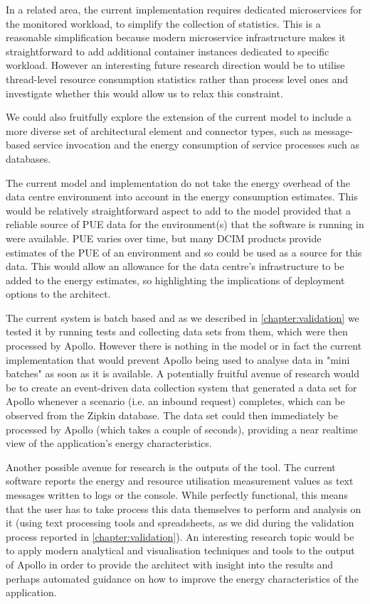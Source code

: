 In a related area, the current implementation requires dedicated microservices for the monitored workload, to simplify the collection of statistics.  This is a reasonable simplification because modern microservice infrastructure makes it straightforward to add additional container instances dedicated to specific workload.  However an interesting future research direction would be to utilise thread-level resource consumption statistics rather than process level ones and investigate whether this would allow us to relax this constraint.

We could also fruitfully explore the extension of the current model to include a more diverse set of architectural element and connector types, such as message-based service invocation and the energy consumption of service processes such as databases.

The current model and implementation do not take the energy overhead of the data centre environment into account in the energy consumption estimates.  This would be relatively straightforward aspect to add to the model provided that a reliable source of PUE data for the environment(s) that the software is running in were available.  PUE varies over time, but many DCIM products provide estimates of the PUE of an environment and so could be used as a source for this data.  This would allow an allowance for the data centre's infrastructure to be added to the energy estimates, so highlighting the implications of deployment options to the architect.

The current system is batch based and as we described in \cref{chapter:validation} we tested it by running tests and collecting data sets from them, which were then processed by Apollo.  However there is nothing in the model or in fact the current implementation that would prevent Apollo being used to analyse data in "mini batches" as soon as it is available.  A potentially fruitful avenue of research would be to create an event-driven data collection system that generated a data set for Apollo whenever a scenario (i.e. an inbound request) completes, which can be observed from the Zipkin database.  The data set could then immediately be processed by Apollo (which takes a couple of seconds), providing a near realtime view of the application's energy characteristics.

Another possible avenue for research is the outputs of the tool.  The current software reports the energy and resource utilisation measurement values as text messages written to logs or the console.  While perfectly functional, this means that the user has to take process this data themselves to perform and analysis on it (using text processing tools and spreadsheets, as we did during the validation process reported in \cref{chapter:validation}).  An interesting research topic would be to apply modern analytical and visualisation techniques and tools to the output of Apollo in order to provide the architect with insight into the results and perhaps automated guidance on how to improve the energy characteristics of the application.

